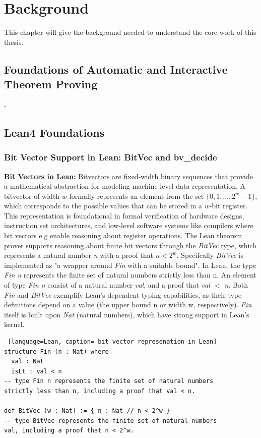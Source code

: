 
\chapter{Background }

This chapter will give the background needed to understand the core work of this thesis. 

\section{Foundations of Automatic and Interactive Theorem Proving} 
-

\section{Lean4 Foundations} 
\subsection{Bit Vector Support in Lean: BitVec and bv\_decide} 
\textbf{Bit Vectors in Lean:}
Bitvectors are fixed-width binary sequences that provide a mathematical abstraction for modeling machine-level data representation. A bitvector of width $w$ formally represents an element from the set $\{0, 1, \ldots, 2^w - 1\}$, which corresponds to the possible values that can be stored in a $w$-bit register. This representation is foundational in formal verification of hardware designs, instruction set architectures, and low-level software systems like compilers where bit vectors e.g enable reasoning about register operations. The Lean theorem prover supports reasoning about finite bit vectors through the \textit{BitVec} type, which represents a natural number \textit{n} with a proof that \( n < 2^w \). Specifcally \textit{BitVec} is implemented as "a wrapper around \textit{Fin} with a suitable bound". In Lean, the type \textit{Fin n} represents the finite set of natural numbers strictly less than n. An element of type \textit{Fin n} consist of a natural number \textit{val}, and a proof that \textit{val \( < \) n}. Both \textit{Fin} and  \textit{BitVec} exemplify Lean's dependent typing capabilities, as their type definitions depend on a value (the upper bound n or width w, respectively). \textit{Fin} itself is built upon \textit{Nat} (natural numbers), which have strong support in Lean's kernel.\newline


\begin{lstlisting} [language=Lean, caption= bit vector represenation in Lean]
structure Fin (n : Nat) where
  val : Nat
  isLt : val < n 
-- type Fin n represents the finite set of natural numbers
strictly less than n, including a proof that val < n.

def BitVec (w : Nat) := { n : Nat // n < 2^w }
-- type BitVec represents the finite set of natural numbers
val, including a proof that n < 2^w.
\end{lstlisting}

